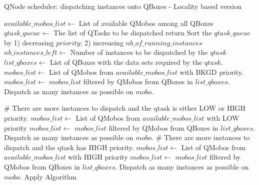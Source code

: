 \begin{algorithm} %
    \caption{QNode scheduler: dispatching instances onto QBoxes - Locality based version}
    \label{alg:LocalityBasedSched}
        \begin{algorithmic}[2]
            \STATE $available\_mobos\_list \leftarrow$ List of available QMobos among all QBoxes
            \STATE $qtask\_queue \leftarrow$ The list of QTasks to be dispatched
                \STATE return
            \ELSE
                \STATE Sort the $qtask\_queue$ by 1) decreasing $priority$; 2) increasing $nb\_of\_running\_instances$
                	\STATE $nb\_instances\_left \leftarrow$ Number of instances to be dispatched by the $qtask$
                        \STATE $list\_qboxes \leftarrow$ List of QBoxes with the data sets required by the $qtask$.
                        \STATE $mobos\_list \leftarrow$ List of QMobos from $available\_mobos\_list$ with BKGD priority.
                        \STATE $mobos\_list \leftarrow$ $mobos\_list$ filtered by QMobos from QBoxes in $list\_qboxes$.
                            \STATE Dispatch as many instances as possible on $mobo$.
                        \ENDFOR
                        
                            \STATE \# There are more instances to dispatch and the qtask is either LOW or HIGH priority.
                        \STATE $mobos\_list \leftarrow$ List of QMobos from $available\_mobos\_list$ with LOW priority
                        \STATE $mobos\_list \leftarrow$ $mobos\_list$ filtered by QMobos from QBoxes in $list\_qboxes$.
                                \STATE Dispatch as many instances as possible on $mobo$.
                            \ENDFOR
                                \STATE \# There are more instances to dispatch and the qtask has HIGH priority.
                                \STATE $mobos\_list \leftarrow$ List of QMobos from $available\_mobos\_list$ with HIGH priority
                                \STATE $mobos\_list \leftarrow$ $mobos\_list$ filtered by QMobos from QBoxes in $list\_qboxes$.
                                    \STATE Dispatch as many instances as possible on $mobo$.
                                \ENDFOR
                            \ENDIF
                        \ENDIF
                    \ENDIF
                \ENDFOR
                \STATE Apply Algorithm 
            \ENDIF
        \end{algorithmic}
\end{algorithm}

